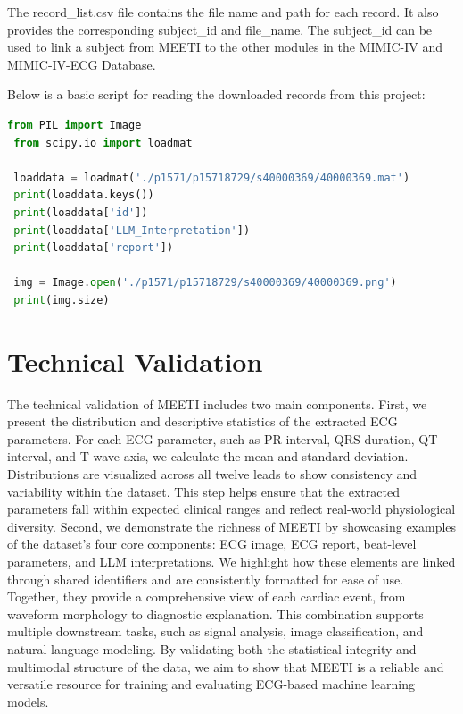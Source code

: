 \documentclass[12pt,letterpaper]{article}
\begin{document}
The record\_list.csv file contains the file name and path for each record. It also provides the corresponding subject\_id and file\_name. The subject\_id can be used to link a subject from MEETI to the other modules in the MIMIC-IV and MIMIC-IV-ECG Database.

Below is a basic script for reading the downloaded records from this project:

\begin{lstlisting}[language=Python]
 from PIL import Image
 from scipy.io import loadmat
 
 loaddata = loadmat('./p1571/p15718729/s40000369/40000369.mat')
 print(loaddata.keys())
 print(loaddata['id'])
 print(loaddata['LLM_Interpretation'])
 print(loaddata['report'])

 img = Image.open('./p1571/p15718729/s40000369/40000369.png')
 print(img.size)
\end{lstlisting}


\section*{Technical Validation}

The technical validation of MEETI includes two main components. First, we present the distribution and descriptive statistics of the extracted ECG parameters. For each ECG parameter, such as PR interval, QRS duration, QT interval, and T-wave axis, we calculate the mean and standard deviation. Distributions are visualized across all twelve leads to show consistency and variability within the dataset. This step helps ensure that the extracted parameters fall within expected clinical ranges and reflect real-world physiological diversity. Second, we demonstrate the richness of MEETI by showcasing examples of the dataset’s four core components: ECG image, ECG report, beat-level parameters, and LLM interpretations. We highlight how these elements are linked through shared identifiers and are consistently formatted for ease of use. Together, they provide a comprehensive view of each cardiac event, from waveform morphology to diagnostic explanation. This combination supports multiple downstream tasks, such as signal analysis, image classification, and natural language modeling. By validating both the statistical integrity and multimodal structure of the data, we aim to show that MEETI is a reliable and versatile resource for training and evaluating ECG-based machine learning models.
\end{document}
